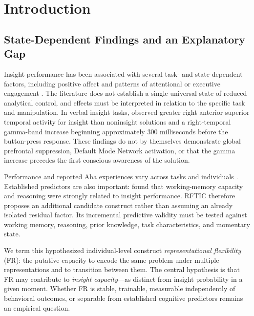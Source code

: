 \documentclass[a4paper,twocolumn,10pt]{article}
\begin{document}
\section{Introduction}

\subsection{State-Dependent Findings and an Explanatory Gap}

Insight performance has been associated with several task- and state-dependent factors, including
positive affect and patterns of attentional or executive engagement \citep{subramaniam2009positive,
kounios2014neuroscience}. The literature does not establish a single universal state of reduced
analytical control, and effects must be interpreted in relation to the specific task and manipulation.
In verbal insight tasks, \citet{jungbeeman2004neural} observed greater right anterior superior
temporal activity for insight than noninsight solutions and a right-temporal gamma-band increase
beginning approximately 300 milliseconds before the button-press response. These findings do not by
themselves demonstrate global prefrontal suppression, Default Mode Network activation, or that the
gamma increase precedes the first conscious awareness of the solution.

Performance and reported Aha experiences vary across tasks and individuals
\citep{danek2014magic,webb2018aha}. Established predictors are also important:
\citet{chuderski2018aha} found that working-memory capacity and reasoning were strongly related to
insight performance. RFTIC therefore proposes an additional candidate construct rather than assuming
an already isolated residual factor. Its incremental predictive validity must be tested against
working memory, reasoning, prior knowledge, task characteristics, and momentary state.

We term this hypothesized individual-level construct \emph{representational flexibility} (FR): the
putative capacity to encode the same problem under multiple representations and to transition between
them. The central hypothesis is that FR may contribute to \emph{insight capacity}---as distinct from
insight probability in a given moment. Whether FR is stable, trainable, measurable independently of
behavioral outcomes, or separable from established cognitive predictors remains an empirical
question.
\end{document}
